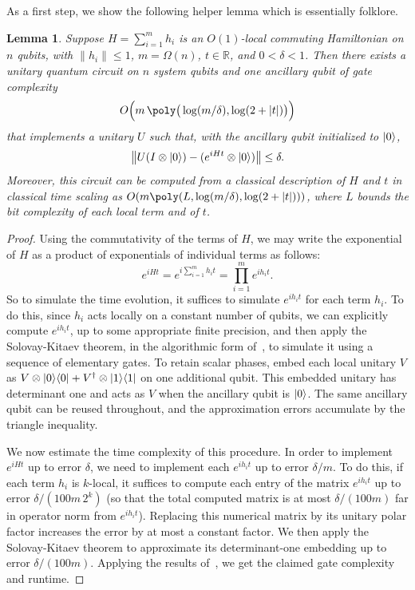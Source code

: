\documentclass[a4paper,onecolumn,11pt]{quantumarticle}
\theoremstyle{plain}
\newtheorem{lemma}[theorem]{Lemma}
\newcommand{\proj}[1]{\ket{#1}\!\bra{#1}}
\begin{document}
As a first step, we show the following helper lemma which is essentially folklore.
\begin{lemma}\label{lem:com-ham-fast}
    Suppose $H = \sum_{i=1}^{m} h_i$ is an $O(1)$-local commuting Hamiltonian on $n$ qubits, with $\|h_i\|\leq 1$, $m = \Omega(n)$, $t\in\mathbb{R}$, and $0<\delta<1$. Then there exists a unitary quantum circuit on $n$ system qubits and one ancillary qubit of gate complexity 
     \[ O\Big(m \, \poly\big(\log(m/\delta), \log(2+|t|)\big)\Big)\]
     that implements a unitary $U$ such that, with the ancillary qubit initialized to $\ket{0}$,
     \[ \big\|U(I\otimes\ket{0})-(e^{iHt}\otimes\ket{0})\big\| \leq \delta. \] 
     Moreover, this circuit can be computed from a classical description of $H$ and $t$ in classical time scaling as $O(m \poly(L,\log(m/\delta),\log(2+|t|)))$, where $L$ bounds the bit complexity of each local term and of $t$.
\end{lemma}
\begin{proof}
   Using the commutativity of the terms of $H$, we may write the exponential of $H$ as a product of exponentials of individual terms as follows:
    \[ e^{iHt} = e^{i\sum_{i=1}^{m} h_i t} = \prod_{i=1}^{m} e^{i h_i t}. \]
    So to simulate the time evolution, it suffices to simulate $e^{i h_i t}$ for each term $h_i$.
    To do this, since $h_i$ acts locally on a constant number of qubits, we can explicitly compute $e^{ih_i t}$, up to some appropriate finite precision, and then apply the Solovay-Kitaev theorem, in the algorithmic form of~\cite{dawson2006solovay}, to simulate it using a sequence of elementary gates. To retain scalar phases, embed each local unitary $V$ as $V\otimes\proj{0}+V^\dagger\otimes\proj{1}$ on one additional qubit. This embedded unitary has determinant one and acts as $V$ when the ancillary qubit is $\ket{0}$. The same ancillary qubit can be reused throughout, and the approximation errors accumulate by the triangle inequality.
    
    We now estimate the time complexity of this procedure. In order to implement $e^{iHt}$ up to error $\delta$, we need to implement each $e^{i h_i t}$ up to error $\delta/m$. To do this, if each term $h_i$ is $k$-local, it suffices to compute each entry of the matrix $e^{i h_i t}$ up to error $\delta/(100m\,2^k)$ (so that the total computed matrix is at most $\delta/(100m)$ far in operator norm from $e^{ih_i t}$). Replacing this numerical matrix by its unitary polar factor increases the error by at most a constant factor. We then apply the Solovay-Kitaev theorem to approximate its determinant-one embedding up to error $\delta/(100m)$. Applying the results of~\cite{dawson2006solovay}, we get the claimed gate complexity and runtime.
\end{proof}
\end{document}

